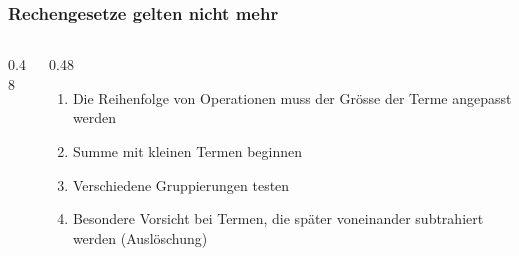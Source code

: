%
%
%
\begin{frame}
\frametitle{Rechengesetze gelten nicht mehr}
\begin{columns}
\begin{column}{0.48\hsize}

\end{column}
\begin{column}{0.48\hsize}
\begin{enumerate}
\item<2->
Die Reihenfolge von Operationen muss der Grösse der Terme
angepasst werden
\item<3->
Summe mit kleinen Termen beginnen
\item<4->
Verschiedene Gruppierungen testen
\item<5->
Besondere Vorsicht bei Termen, die später voneinander subtrahiert werden
(Auslöschung)
\end{enumerate}
\end{column}
\end{columns}
\end{frame}

